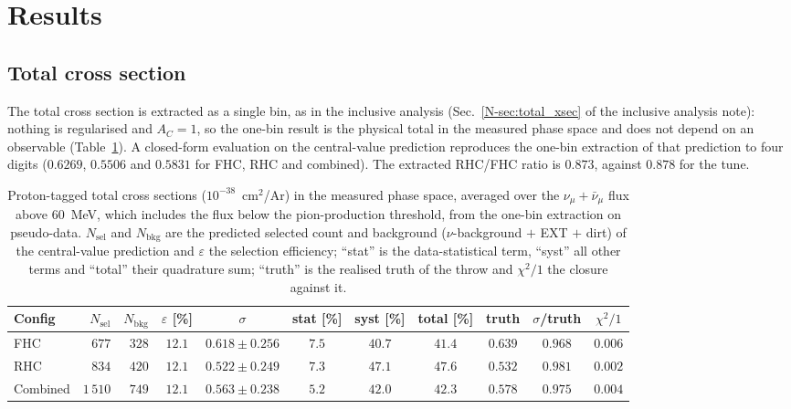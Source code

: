 \documentclass[11pt,a4paper]{article}
\newcommand{\noteref}[2]{#1~\ref{N-#2} of the inclusive analysis note}
\begin{document}
\section{Results}
\label{sec:pt_proposed}

\subsection{Total cross section}
\label{sec:pt_total}

The total cross section is extracted as a single bin, as in the inclusive analysis
(\noteref{Sec.}{sec:total_xsec}): nothing is regularised and $A_C=1$, so the one-bin result is the
physical total in the measured phase space and does not depend on an observable
(Table~\ref{tab:pt_total}). A closed-form evaluation on the central-value
prediction reproduces the one-bin extraction of that prediction to four digits ($0.6269$, $0.5506$
and $0.5831$ for FHC, RHC and combined). The extracted RHC/FHC ratio is $0.873$, against $0.878$ for
the tune.

\begin{table}[H]
  \centering
  \caption{Proton-tagged total cross sections ($10^{-38}$~cm$^2$/Ar) in the measured phase space,
    averaged over the $\nu_\mu+\bar\nu_\mu$ flux above $60$~MeV, which includes the flux below the
    pion-production threshold, from the one-bin extraction on
    pseudo-data. $N_\mathrm{sel}$ and $N_\mathrm{bkg}$ are the
    predicted selected count and background ($\nu$-background $+$ EXT $+$ dirt) of the central-value
    prediction and $\varepsilon$ the selection efficiency; ``stat'' is the data-statistical term,
    ``syst'' all other terms and ``total'' their quadrature sum; ``truth'' is the realised truth of the
    throw and $\chi^2/1$ the closure against it.}
  \label{tab:pt_total}
  \footnotesize
  \begin{tabular}{lrrcccccccc}
\toprule
Config & $N_\mathrm{sel}$ & $N_\mathrm{bkg}$ & $\varepsilon$ [\%] & $\sigma$ & stat [\%] & syst [\%] & total [\%] & truth & $\sigma$/truth & $\chi^2/1$ \\
\midrule
    FHC      & $677$ & $328$ & $12.1$ & $0.618\pm0.256$ & $7.5$ & $40.7$ & $41.4$ & $0.639$ & $0.968$ & $0.006$ \\
    RHC      & $834$ & $420$ & $12.1$ & $0.522\pm0.249$ & $7.3$ & $47.1$ & $47.6$ & $0.532$ & $0.981$ & $0.002$ \\
    Combined & $1\,510$ & $749$ & $12.1$ & $0.563\pm0.238$ & $5.2$ & $42.0$ & $42.3$ & $0.578$ & $0.975$ & $0.004$ \\
\bottomrule
\end{tabular}
\end{table}
\end{document}
